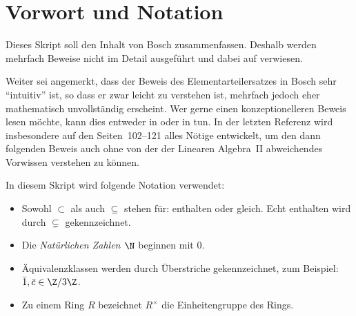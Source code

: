 
\chapter{Vorwort und Notation}
Dieses Skript soll den Inhalt von Bosch\cite[S.\,206\,ff., 6.3]{bookc:bosch08}
zusammenfassen. Deshalb werden mehrfach Beweise nicht im Detail ausgeführt und
dabei auf \cite{bookc:bosch08} verwiesen.

Weiter sei angemerkt, dass der Beweis des Elementarteilersatzes in
Bosch\cite{bookc:bosch08} sehr \enquote{intuitiv} ist, so dass er zwar leicht zu
verstehen ist, mehrfach jedoch eher mathematisch unvollständig erscheint.
Wer gerne einen konzeptionelleren Beweis lesen möchte, kann dies entweder in
\cite[Kap.~7]{lecnotes:gub:alg2} oder in \cite[Kap.~22]{lecnotes:jan:la2} tun.
In der letzten Referenz wird insbesondere auf den Seiten~102--121 alles Nötige
entwickelt, um den dann folgenden Beweis auch ohne von der der Linearen Algebra~II
abweichendes Vorwissen verstehen zu können.

\bigskip
In diesem Skript wird folgende Notation verwendet:
\begin{itemize}
    \item
        Sowohl $\subset$ als auch $\subseteq$ stehen für: enthalten oder gleich.
        Echt enthalten wird durch $\subsetneq$ gekennzeichnet.

    \item
        Die \emph{Natürlichen Zahlen $\N$} beginnen mit $0$.

    \item
        Äquivalenzklassen werden durch Überstriche gekennzeichnet, zum Beispiel:
        $\bar 1, \bar c \in \ZRest3$.

    \item
        Zu einem Ring $R$ bezeichnet $R^\times$ die Einheitengruppe des Rings.
\end{itemize}
